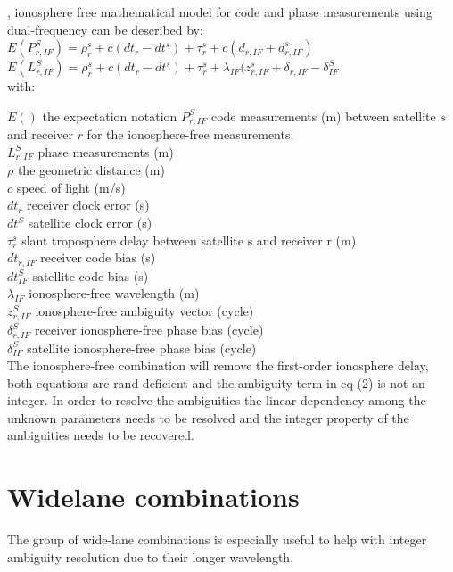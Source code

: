 , ionosphere free mathematical model for code and phase measurements using dual-frequency can be described by:\\

$ E(P_{r,IF}^S) = \rho_{r}^s + c(dt_{r} - dt^s) + \tau_r^s + c (d_{r,IF} + d_{r,IF}^s) $\label{eq:code_IF_eq}\\

$ E(L_{r,IF}^S) = \rho_{r}^s + c(dt_{r} - dt^s) + \tau_r^s + \lambda_{IF} (z_{r,IF}^s + \delta_{r,IF} - \delta_{IF}^S$\label{eq:phase_IF_eq}\\

with:

$E()$ the expectation notation
$P_{r,IF}^S$ code measurements (m) between satellite $s$ and receiver $r$ for the ionosphere-free measurements;\\
$L_{r,IF}^S$ phase measurements (m)\\
$\rho$ the geometric distance (m)\\
$c$ speed of light (m/s)\\
$dt_r$ receiver clock error (s)\\
$dt^S$ satellite clock error (s)\\
$\tau_r^s $ slant troposphere delay between satellite s and receiver r (m)\\
$dt_{r,IF}$ receiver code bias (s)\\
$dt_{IF}^S$ satellite code bias (s)\\
$\lambda_{IF}$ ionosphere-free wavelength (m)\\
$z_{r,IF}^S$ ionosphere-free ambiguity vector (cycle)\\
$\delta_{r,IF}^S$ receiver ionosphere-free phase bias (cycle)\\
$\delta_{IF}^S$ satellite ionosphere-free phase bias (cycle)\\
%
The ionosphere-free combination will remove the first-order ionosphere delay, both equations are rand deficient and the ambiguity term in eq (2) is not an integer. In order to resolve the ambiguities the linear dependency among the unknown parameters needs to be resolved and the integer property of the ambiguities needs to be recovered. 

\section{Widelane combinations}
The group of wide-lane combinations is especially useful to help with integer ambiguity resolution due to their longer wavelength.


